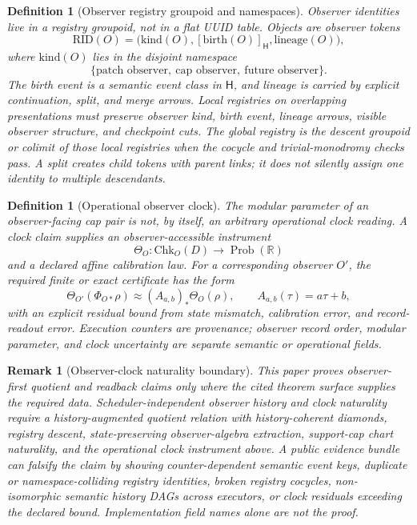 \documentclass[11pt]{article}
\newtheorem{definition}[theorem]{Definition}
\newtheorem{remark}[theorem]{Remark}
\begin{document}
\begin{definition}[Observer registry groupoid and namespaces]\label{def:observer-registry-groupoid}
Observer identities live in a registry groupoid, not in a flat UUID table. Objects are observer
tokens
\[
\mathrm{RID}(O)=\bigl(\mathrm{kind}(O),[\mathrm{birth}(O)]_{\mathsf H},\mathrm{lineage}(O)\bigr),
\]
where \(\mathrm{kind}(O)\) lies in the disjoint namespace
\[
\{\text{patch observer},\ \text{cap observer},\ \text{future observer}\}.
\]
The birth event is a semantic event class in \(\mathsf H\), and lineage is carried by explicit
continuation, split, and merge arrows. Local registries on overlapping presentations must preserve
observer kind, birth event, lineage arrows, visible observer structure, and checkpoint cuts. The
global registry is the descent groupoid or colimit of those local registries when the cocycle and
trivial-monodromy checks pass. A split creates child tokens with parent links; it does not silently
assign one identity to multiple descendants.
\end{definition}

\begin{definition}[Operational observer clock]\label{def:operational-observer-clock}
The modular parameter of an observer-facing cap pair is not, by itself, an arbitrary operational
clock reading. A clock claim supplies an observer-accessible instrument
\[
\Theta_O:\mathrm{Chk}_O(D)\to\operatorname{Prob}(\mathbb R)
\]
and a declared affine calibration law. For a corresponding observer \(O'\), the required finite
or exact certificate has the form
\[
\Theta_{O'}(\Phi_{O*}\rho)
\approx
(A_{a,b})_*\Theta_O(\rho),
\qquad
A_{a,b}(\tau)=a\tau+b,
\]
with an explicit residual bound from state mismatch, calibration error, and record-readout error.
Execution counters are provenance; observer record order, modular parameter, and clock
uncertainty are separate semantic or operational fields.
\end{definition}

\begin{remark}[Observer-clock naturality boundary]\label{rem:observer-clock-naturality-gate}
This paper proves observer-first quotient and readback claims only where the cited theorem
surface supplies the required data. Scheduler-independent observer history and clock naturality
require a history-augmented quotient relation with history-coherent diamonds, registry descent,
state-preserving observer-algebra extraction, support-cap chart naturality, and the operational
clock instrument above. A public evidence bundle can falsify the claim by showing counter-dependent
semantic event keys, duplicate or namespace-colliding registry identities, broken registry
cocycles, non-isomorphic semantic history DAGs across executors, or clock residuals exceeding the
declared bound. Implementation field names alone are not the proof.
\end{remark}
\end{document}
